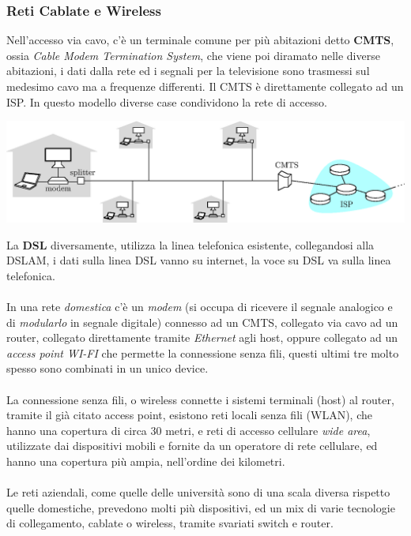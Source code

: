 \documentclass[12pt, letterpaper]{article}
\newcommand{\acc}{\\\hphantom{}\\}
\begin{document}
\subsubsection{Reti Cablate e Wireless}
Nell'accesso via cavo, c'è un terminale comune per più abitazioni detto \textbf{CMTS}, ossia \textit{Cable Modem Termination System},
che viene poi diramato nelle diverse abitazioni, i dati dalla rete ed i segnali per la televisione sono trasmessi sul medesimo
cavo ma a frequenze differenti. Il CMTS è direttamente collegato ad un ISP. In questo modello diverse case condividono la rete di
accesso.\begin{center}
    \includegraphics[width=1.1\textwidth ]{images/cableHeadend.eps}
\end{center}
La \textbf{DSL} diversamente, utilizza la linea telefonica esistente, collegandosi alla DSLAM, i dati sulla linea
DSL vanno su internet, la voce su DSL va sulla linea telefonica. \acc
In una rete \textit{domestica}  c'è un \textit{modem}
(si occupa di ricevere il segnale analogico e di  \textit{modularlo} in segnale digitale)
connesso ad un CMTS, collegato via cavo ad
un router, collegato direttamente tramite \textit{Ethernet} agli host, oppure collegato ad un \textit{access point WI-FI} che
permette la connessione senza fili, questi ultimi tre molto spesso sono combinati in un unico device.\acc
La connessione senza fili, o wireless connette i sistemi terminali (host) al router, tramite il già citato
access point, esistono reti locali senza fili (WLAN), che hanno una copertura di circa 30 metri, e reti di accesso
cellulare \textit{wide area}, utilizzate dai dispositivi mobili e fornite da un operatore di rete cellulare, ed hanno una
copertura più ampia, nell'ordine dei kilometri.\acc
Le reti aziendali, come quelle delle università sono di una scala diversa rispetto quelle domestiche, prevedono molti più
dispositivi, ed un mix di varie tecnologie di collegamento, cablate o wireless, tramite svariati switch e router.
\end{document}
